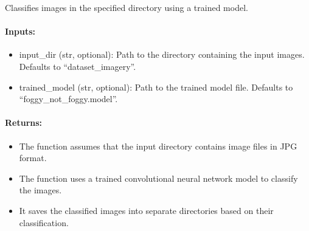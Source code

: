 \documentclass[letterpaper,10pt,english]{sphinxmanual}
\begin{document}
\begin{fulllineitems}
\label{\detokenize{akhdefo_functions:akhdefo_functions.Akhdefo_Tools.classification}}
\pysigstartsignatures
{}
\pysigstopsignatures
\sphinxAtStartPar
Classifies images in the specified directory using a trained model.


\paragraph{Inputs:}
\label{\detokenize{akhdefo_functions:inputs}}\begin{itemize}
\item {} 
\sphinxAtStartPar
input\_dir (str, optional): Path to the directory containing the input images. Defaults to “dataset\_imagery”.

\item {} 
\sphinxAtStartPar
trained\_model (str, optional): Path to the trained model file. Defaults to “foggy\_not\_foggy.model”.

\end{itemize}


\paragraph{Returns:}
\label{\detokenize{akhdefo_functions:id13}}\begin{itemize}
\item {} 
\sphinxAtStartPar
The function assumes that the input directory contains image files in JPG format.

\item {} 
\sphinxAtStartPar
The function uses a trained convolutional neural network model to classify the images.

\item {} 
\sphinxAtStartPar
It saves the classified images into separate directories based on their classification.

\end{itemize}

\end{fulllineitems}
\end{document}
